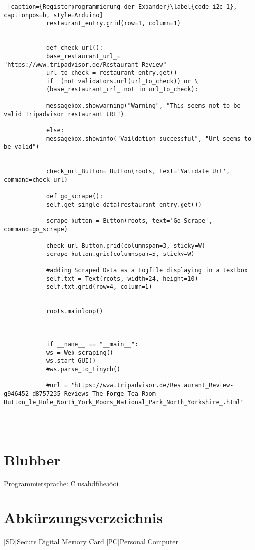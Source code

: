 \documentclass[a4paper,oneside,12pt]{report}
\begin{document}
\begin{lstlisting} [caption={Registerprogrammierung der Expander}\label{code-i2c-1}, captionpos=b, style=Arduino]
			restaurant_entry.grid(row=1, column=1)
			
			
			def check_url():
			base_restaurant_url_= "https://www.tripadvisor.de/Restaurant_Review"
			url_to_check = restaurant_entry.get()
			if  (not validators.url(url_to_check)) or \
			(base_restaurant_url_ not in url_to_check):
			
			messagebox.showwarning("Warning", "This seems not to be valid Tripadvisor restaurant URL")
			
			else:
			messagebox.showinfo("Vaildation successful", "Url seems to be valid")
			
			
			check_url_Button= Button(roots, text='Validate Url', command=check_url)
			
			def go_scrape():
			self.get_single_data(restaurant_entry.get())
			
			scrape_button = Button(roots, text='Go Scrape', command=go_scrape)
			
			check_url_Button.grid(columnspan=3, sticky=W)
			scrape_button.grid(columnspan=5, sticky=W)
			
			#adding Scraped Data as a Logfile displaying in a textbox
			self.txt = Text(roots, width=24, height=10)
			self.txt.grid(row=4, column=1)
			
			
			roots.mainloop()
			
			
			
			if __name__ == "__main__":
			ws = Web_scraping()
			ws.start_GUI()
			#ws.parse_to_tinydb()
			
			#url = "https://www.tripadvisor.de/Restaurant_Review-g946452-d8757235-Reviews-The_Forge_Tea_Room-Hutton_le_Hole_North_York_Moors_National_Park_North_Yorkshire_.html"
			
			
			     
			\end{lstlisting}

		
		
		
		
		
		
		
	\chapter{Blubber}\label{bluber}	
	
		Programmiersprache: C	
		usahdfiheaöoi
				
			

		

		
			
		
	
	
	

	\chapter*{Abkürzungsverzeichnis}
	\vspace{1.0cm}
	\begin{acronym}[SEPSEP]
	  	[SD]{Secure Digital Memory Card}
	  	[PC]{Personal Computer}
	\end{acronym}
\end{document}
